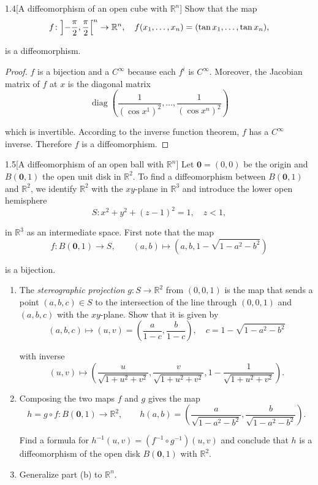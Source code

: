 \begin{problem}{1.4}[A diffeomorphism of an open cube with \(\mathbb{R}^{n}\)]
Show that the map
\[
	f\colon{\left]{-\frac{\pi}{2},\frac{\pi}{2}}\right[}^{n}\to\mathbb{R}^{n}, \quad f(x_{1},\ldots,x_{n})=(\tan x_{1},\ldots,\tan x_{n}),
\]

is a diffeomorphism.
\end{problem}

\begin{proof}
	\( f \) is a bijection and a \( C^{\infty} \) because each \( f^{i} \) is \( C^{\infty} \). Moreover, the Jacobian matrix of \( f \) at \( x \) is the diagonal matrix
	\[
		\operatorname{diag}\left(\frac{1}{{(\cos x^{1})}^{2}}, \ldots, \frac{1}{{(\cos x^{n})}^{2}}\right)
	\]

	which is invertible. According to the inverse function theorem, \( f \) has a \( C^{\infty} \) inverse. Therefore \( f \) is a diffeomorphism.
\end{proof}

\begin{problem}{1.5}[A diffeomorphism of an open ball with \( \mathbb{R}^{n} \)]
Let \( \mathbf{0} = (0, 0) \) be the origin and \( B(\mathbf{0}, 1) \) the open unit disk in \( \mathbb{R}^{2} \). To find a diffeomorphism between \( B(\mathbf{0}, 1) \) and \( \mathbb{R}^{2} \), we identify \( \mathbb{R}^{2} \) with the \( xy \)-plane in \( \mathbb{R}^{3} \) and introduce the lower open hemisphere
\[
	S: x^{2} + y^{2} + {(z - 1)}^{2} = 1, \quad z < 1,
\]

in \( \mathbb{R}^{3} \) as an intermediate space. First note that the map
\[
	f: B(\mathbf{0}, 1) \to S, \qquad (a, b) \mapsto (a, b, 1 - \sqrt{1 - a^{2} - b^{2}})
\]

is a bijection.
\begin{enumerate}[label={(\alph*)}]
	\item The \textit{stereographic projection} \( g: S \to \mathbb{R}^{2} \) from \( (0, 0, 1) \) is the map that sends a point \( (a, b, c) \in S \) to the intersection of the line through \( (0, 0, 1) \) and \( (a, b, c) \) with the \( xy \)-plane. Show that it is given by
	      \[
		      (a, b, c) \mapsto (u, v) = \left(\frac{a}{1-c}, \frac{b}{1-c}\right), \quad c = 1 - \sqrt{1 - a^{2} - b^{2}}
	      \]

	      with inverse
	      \[
		      (u, v) \mapsto \left(\frac{u}{\sqrt{1 + u^{2} + v^{2}}}, \frac{v}{\sqrt{1 + u^{2} + v^{2}}}, 1 - \frac{1}{\sqrt{1 + u^{2} + v^{2}}}\right).
	      \]
	\item Composing the two maps \( f \) and \( g \) gives the map
	      \[
		      h = g\circ f: B(\mathbf{0}, 1) \to \mathbb{R}^{2},\qquad h(a, b) = \left(\frac{a}{\sqrt{1 - a^{2} - b^{2}}}, \frac{b}{\sqrt{1 - a^{2} - b^{2}}}\right).
	      \]

	      Find a formula for \( h^{-1}(u, v) = {(f^{-1} \circ g^{-1})}(u, v) \) and conclude that \( h \) is a diffeomorphism of the open disk \( B(\mathbf{0}, 1) \) with \( \mathbb{R}^{2} \).
	\item Generalize part (b) to \( \mathbb{R}^{n} \).
\end{enumerate}
\end{problem}

